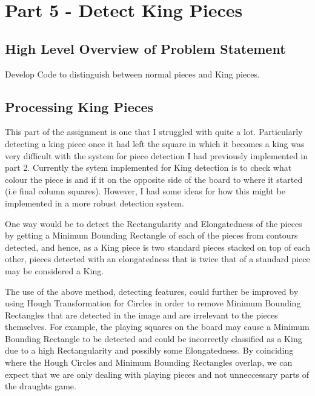 \documentclass[11pt]{article}
\begin{document}
    \newpage
    \section{Part 5 - Detect King Pieces}
    \subsection{High Level Overview of Problem Statement}
    \par
    Develop Code to distinguish between normal pieces and King pieces.

    \subsection{Processing King Pieces}
    \par
    This part of the assignment is one that I struggled with quite a lot. Particularly detecting a king piece once it had left the square in which it becomes a king was very difficult with the system for piece detection I had previously implemented in part 2. Currently the sytem implemented for King detection is to check what colour the piece is and if it on the 
    opposite side of the board to where it started (i.e final column squares). However, I had some ideas for how this might be implemented in a more robust detection system.
    \par
    One way would be to detect the Rectangularity and Elongatedness of the pieces by getting a Minimum Bounding Rectangle of each of the pieces from contours detected, and hence, as a King piece is two standard pieces stacked on top of each other, pieces detected with an elongatedness that is twice that of a standard piece may be considered a King. 
    \par
    The use of the above method, detecting features, could further be improved by using Hough Transformation for Circles in order to remove Minimum Bounding Rectangles that are detected in the image and are irrelevant to the pieces themselves. For example, the playing squares on the board may cause a Minimum Bounding Rectangle to be detected and could be incorrectly classified
    as a King due to a high Rectangularity and possibly some Elongatedness. By coinciding where the Hough Circles and Minimum Bounding Rectangles overlap, we can expect that we are only dealing with playing pieces and not unneccessary parts of the draughts game.
\end{document}
